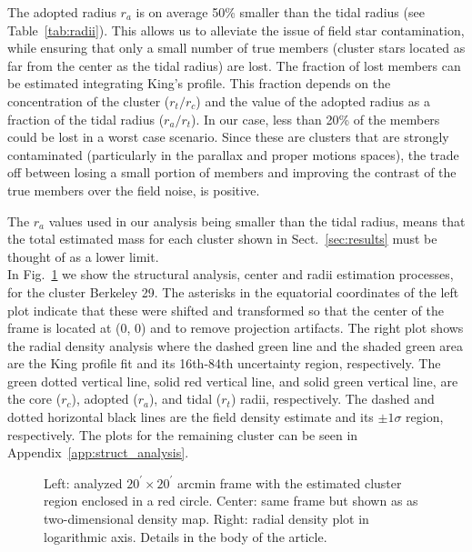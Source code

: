 \documentclass[draft]{aa}
\begin{document}
  The adopted radius $r_{a}$ is on average 50\% smaller than the
  tidal radius (see Table~\ref{tab:radii}). This allows us to alleviate the
  issue of field star contamination, while ensuring that only a small number of
  true members (cluster stars located as far from the center as the tidal
  radius) are lost.
  The fraction of lost members can be estimated integrating King's profile. This
  fraction depends on the concentration of the cluster ($r_{t}/r_{c}$) and the
  value of the adopted radius as a fraction of the tidal radius ($r_{a}/r_{t}$).
  In our case, less than 20\% of the members could be lost in a worst case
  scenario. Since these are clusters that are strongly contaminated 
  (particularly in the parallax and proper motions spaces), the trade off
  between losing a small portion of members and improving the contrast of the
  true members over the field noise, is positive.

  The $r_{a}$ values used in our analysis being smaller than the tidal radius,
  means that the total estimated mass for each cluster shown in
  Sect.~\ref{sec:results} must be thought of as a lower limit.\\

  In Fig.~\ref{fig:BER29_struct} we show the structural analysis, center and
  radii estimation processes, for the cluster Berkeley 29. The asterisks in the
  equatorial coordinates of the left plot indicate that these were shifted
  and transformed so that the center of the frame is located at (0, 0) and to
  remove projection artifacts. The right plot shows the radial density analysis
  where the dashed green line and the shaded green area are the King profile fit
  and its 16th-84th uncertainty region, respectively. The green dotted vertical
  line, solid red vertical line, and solid green vertical line, are the core 
  ($r_{c}$), adopted ($r_{a}$), and tidal ($r_{t}$) radii, respectively. The
  dashed and dotted horizontal black lines are the field density estimate and
  its $\pm1\sigma$ region, respectively. The plots for the remaining cluster can
  be seen in Appendix~\ref{app:struct_analysis}.

  \begin{figure}
   \caption{Left: analyzed $20^{\prime} \times 20^{\prime}$ arcmin frame with the
   estimated cluster region enclosed in a red circle. Center: same frame but
   shown as as two-dimensional density map. Right: radial density plot in
   logarithmic axis. Details in the body of the article.}
   \label{fig:BER29_struct}
  \end{figure}
\end{document}
